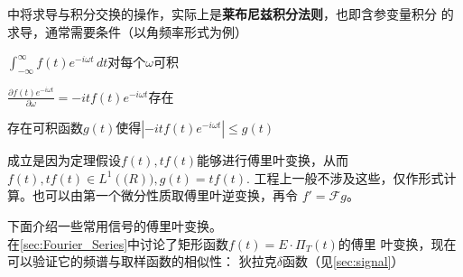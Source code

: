 \documentclass{ctexbook}
\begin{document}
中将求导与积分交换的操作，实际上是\textbf{莱布尼兹积分法则}，也即含参变量积分
的求导，通常需要条件（以角频率形式为例）\begin{circlist}
    \item $\int_{-\infty}^{\infty}f(t)e^{-i\omega t}\,dt$对每个$\omega$可积
    \item $\frac{\partial f(t)e^{-i\omega t}}{\partial \omega}=-itf(t)e^{-i\omega t}$存在
    \item 存在可积函数$g(t)$使得$|-itf(t)e^{-i\omega t}|\leq g(t)$
\end{circlist}
成立是因为定理假设$f(t),tf(t)$能够进行傅里叶变换，从而
$f(t),tf(t)\in L^1(\mathbb(R)),g(t)=tf(t)$.
工程上一般不涉及这些，仅作形式计算。也可以由第一个微分性质取傅里叶逆变换，再令
$f'=\mathcal{F} g$。

下面介绍一些常用信号的傅里叶变换。\\
\textbullet 在\ref{sec:Fourier_Series}中讨论了矩形函数$f(t)=E\cdot\Pi_T(t)$的傅里
叶变换，现在可以验证它的频谱与取样函数的相似性：
\textbullet 狄拉克$\delta$函数（见\ref{sec:signal}）
\end{document}
